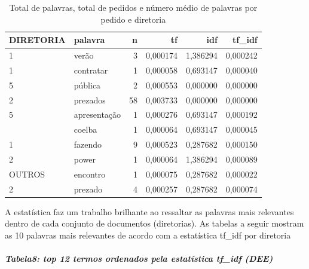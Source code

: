 \documentclass[]{article}
\let\oldsubparagraph\subparagraph
\renewcommand{\subparagraph}[1]{\oldsubparagraph{#1}\mbox{}}
\begin{document}
\begin{table}[!h]

\caption{\label{tab:unnamed-chunk-43}Total de palavras, total de pedidos e número médio de palavras 
        por pedido e diretoria}
\centering
\begin{tabular}{llrrrr}
\toprule
DIRETORIA & palavra & n & tf & idf & tf\_idf\\
\midrule
\rowcolor{gray!6}  1 & verão & 3 & 0,000174 & 1,386294 & 0,000242\\
1 & contratar & 1 & 0,000058 & 0,693147 & 0,000040\\
\rowcolor{gray!6}  5 & pública & 2 & 0,000553 & 0,000000 & 0,000000\\
2 & prezados & 58 & 0,003733 & 0,000000 & 0,000000\\
\rowcolor{gray!6}  5 & apresentação & 1 & 0,000276 & 0,693147 & 0,000192\\
\addlinespace
2 & coelba & 1 & 0,000064 & 0,693147 & 0,000045\\
\rowcolor{gray!6}  1 & fazendo & 9 & 0,000523 & 0,287682 & 0,000150\\
2 & power & 1 & 0,000064 & 1,386294 & 0,000089\\
\rowcolor{gray!6}  OUTROS & encontro & 1 & 0,000075 & 0,287682 & 0,000022\\
2 & prezado & 4 & 0,000257 & 0,287682 & 0,000074\\
\bottomrule
\end{tabular}
\end{table}

A estatística faz um trabalho brilhante ao ressaltar as palavras mais
relevantes dentro de cada conjunto de documentos (diretorias). As
tabelas a seguir mostram as 10 palavras mais relevantes de acordo com a
estatística tf\_idf por diretoria

\hypertarget{tabela8-top-12-termos-ordenados-pela-estatistica-tf_idf-dee}{%
\subparagraph{\texorpdfstring{Tabela8: top 12 termos ordenados pela
estatística \textbf{tf\_idf}
(DEE)}{Tabela8: top 12 termos ordenados pela estatística tf\_idf (DEE)}}\label{tabela8-top-12-termos-ordenados-pela-estatistica-tf_idf-dee}}
\end{document}
